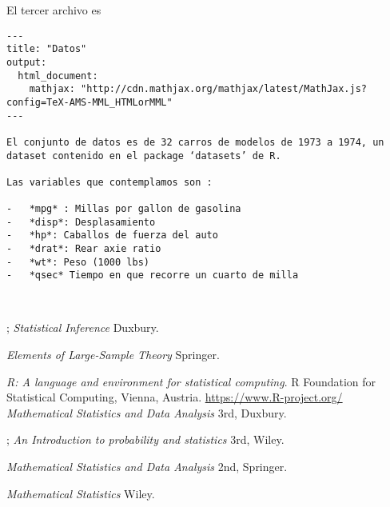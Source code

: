 \documentclass[peerreview]{IEEEtran}
\begin{document}
El tercer archivo es 
\begin{verbatim}
---
title: "Datos"
output: 
  html_document:
    mathjax: "http://cdn.mathjax.org/mathjax/latest/MathJax.js?config=TeX-AMS-MML_HTMLorMML"
---

El conjunto de datos es de 32 carros de modelos de 1973 a 1974, un dataset contenido en el package ‘datasets’ de R.

Las variables que contemplamos son :

-	*mpg* : Millas por gallon de gasolina
-	*disp*: Desplasamiento
-	*hp*: Caballos de fuerza del auto
-	*drat*: Rear axie ratio
-	*wt*: Peso (1000 lbs)
-	*qsec* Tiempo en que recorre un cuarto de milla
	


\end{verbatim}
\newpage

\begin{thebibliography}{99}



;    {\it  Statistical Inference} Duxbury. 


    {\it  Elements of Large-Sample Theory} Springer. 

 {\it R: A language and environment for statistical computing}. R Foundation for Statistical Computing, Vienna, Austria. \url{ https://www.R-project.org/}
    {\it  Mathematical Statistics and Data Analysis} 3rd, Duxbury. 

;    {\it  An Introduction to probability and statistics }3rd, Wiley.

    {\it  Mathematical Statistics and Data Analysis} 2nd, Springer. 

    {\it  Mathematical Statistics }  Wiley.

\end{thebibliography}
\end{document}

